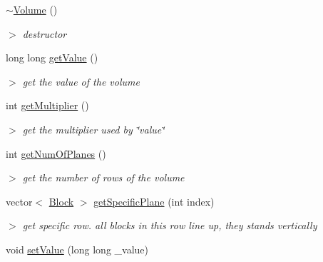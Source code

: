 \begin{DoxyCompactItemize}
\item 
\hypertarget{classVolume_ad5d2015f5c0fea005f02be8f6d60b212}{\hyperlink{classVolume_ad5d2015f5c0fea005f02be8f6d60b212}{$\sim$\-Volume} ()}\label{classVolume_ad5d2015f5c0fea005f02be8f6d60b212}

\begin{DoxyCompactList}\small\item\em $>$ destructor \end{DoxyCompactList}\item 
\hypertarget{classVolume_ab975dcd838fe314b403551e6d57b629c}{long long \hyperlink{classVolume_ab975dcd838fe314b403551e6d57b629c}{get\-Value} ()}\label{classVolume_ab975dcd838fe314b403551e6d57b629c}

\begin{DoxyCompactList}\small\item\em $>$ get the value of the volume \end{DoxyCompactList}\item 
\hypertarget{classVolume_a8b8d68898c25aa27b7fcc00cb57ede88}{int \hyperlink{classVolume_a8b8d68898c25aa27b7fcc00cb57ede88}{get\-Multiplier} ()}\label{classVolume_a8b8d68898c25aa27b7fcc00cb57ede88}

\begin{DoxyCompactList}\small\item\em $>$ get the multiplier used by \char`\"{}value\char`\"{} \end{DoxyCompactList}\item 
\hypertarget{classVolume_a69e856c2247a5bc28d322521699be8c6}{int \hyperlink{classVolume_a69e856c2247a5bc28d322521699be8c6}{get\-Num\-Of\-Planes} ()}\label{classVolume_a69e856c2247a5bc28d322521699be8c6}

\begin{DoxyCompactList}\small\item\em $>$ get the number of rows of the volume \end{DoxyCompactList}\item 
\hypertarget{classVolume_a8cc7673654c77b05b2fa102716ee265b}{vector$<$ \hyperlink{classBlock}{\-Block} $>$ \hyperlink{classVolume_a8cc7673654c77b05b2fa102716ee265b}{get\-Specific\-Plane} (int index)}\label{classVolume_a8cc7673654c77b05b2fa102716ee265b}

\begin{DoxyCompactList}\small\item\em $>$ get specific row. all blocks in this row line up, they stands vertically \end{DoxyCompactList}\item 
\hypertarget{classVolume_a573e89b2f9314b7dda60107420c7700c}{void \hyperlink{classVolume_a573e89b2f9314b7dda60107420c7700c}{set\-Value} (long long \-\_\-value)}\label{classVolume_a573e89b2f9314b7dda60107420c7700c}


\end{DoxyCompactItemize}
